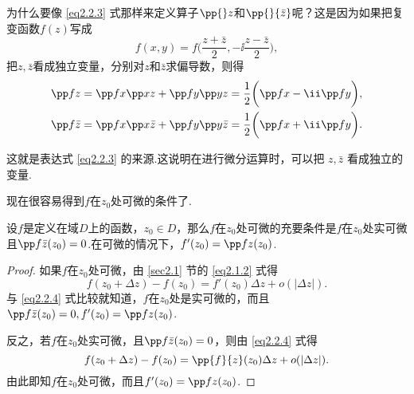 为什么要像 \eqref{eq2.2.3} 式那样来定义算子$\pp{}z$和$\pp{}{\bar z}$呢？这是因为如果把复变函数$f(z)$写成
\[f(x,y)=f\bigg(\frac{z+\bar z}2,-\ii\frac{z-\bar z}2\bigg),\]
把$z,\bar z$看成独立变量，分别对$z$和$\bar z$求偏导数，则得
\begin{gather*}
\pp fz=\pp fx\pp xz+\pp fy\pp yz=\frac12\bigg(\pp fx-\ii\pp fy\bigg),\\
\pp f{\bar z}=\pp fx\pp x{\bar z}+\pp fy\pp y{\bar z}=\frac12\bigg(\pp fx+\ii\pp fy\bigg).
\end{gather*}

这就是表达式 \eqref{eq2.2.3} 的来源.这说明在进行微分运算时，可以把 $z,\bar z$ 看成独立的变量.

现在很容易得到$f$在$z_0$处可微的条件了.
\begin{theorem}\label{thm2.2.3}
设$f$是定义在域$D$上的函数，$z_0\in D$，那么$f$在$z_0$处可微的充要条件是$f$在$z_0$处实可微且$\pp f{\bar z}(z_0)=0$.在可微的情况下，$f'(z_0)=\pp fz(z_0)$.
\end{theorem}
\begin{proof}
如果$f$在$z_0$处可微，由 \ref{sec2.1} 节的 \eqref{eq2.1.2} 式得
\[f(z_0+\Delta z)-f(z_0)=f'(z_0)\Delta z+o(|\Delta z|).\]
与 \eqref{eq2.2.4} 式比较就知道，$f$在$z_0$处是实可微的，而且$\pp f{\bar z}(z_0)=0,f'(z_0)=\pp fz(z_0)$.

反之，若$f$在$z_0$处实可微，且$\pp f{\bar z}(z_0)=0$，则由 \eqref{eq2.2.4} 式得
\[f(z_0+\Delta z)-f(z_0)=\pp{f}{z}(z_0)\Delta z+o(|\Delta z|).\]
由此即知$f$在$z_0$处可微，而且$f'(z_0)=\pp fz(z_0)$.
\end{proof}

